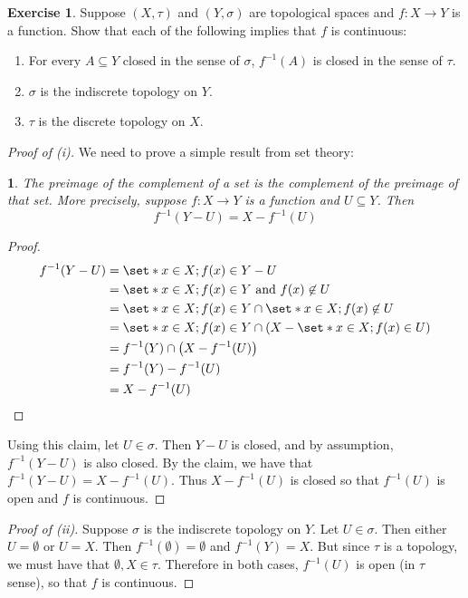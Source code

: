 \documentclass[11pt]{article}
\numberwithin{equation}{section}
\theoremstyle{plain}
\newtheorem{claim}{\color{ForestGreen}{\textbf{Claim}}}[section]
\theoremstyle{definition}
\newtheorem{exercise}{\color{YellowOrange}Exercise}[section]
\newcommand\parens[1]{\left( #1 \right)}
\newcommand\inv[1]{#1^{-1}}
\def\Set{\set*}%
\def\sse{\subseteq}
\newcommand{\1}{\mathbbm 1}
\def\t{\tau}
\begin{document}
\begin{exercise}
	Suppose $(X,\t)$ and $(Y,\sigma)$ are topological spaces and $f: X \to Y$ is a function. Show that each of the following implies that $f$ is continuous:
	\begin{enumerate}
		\item For every $A \sse Y$ closed in the sense of $\sigma$, $\inv{f}(A)$ is closed in the sense of $\t$.
		\item $\sigma$ is the indiscrete topology on $Y$.
		\item $\t$ is the discrete topology on $X$. 
	\end{enumerate}
\end{exercise}

\begin{proof}[Proof of (i)]
	We need to prove a simple result from set theory:
	\begin{claim}
		The preimage of the complement of a set is the complement of the preimage of that set. More precisely, suppose $f: X\to Y$ is a function and $U \sse Y$. Then 
		\begin{equation}
			\inv{f}(Y-U) = X - \inv{f}(U)
		\end{equation}
	\end{claim}
	\begin{proof}
		\begin{align*}
			\inv{f}(Y-U) &= \Set{x \in X; f(x) \in Y-U} \\
			&= \Set{x \in X; f(x) \in Y \text{ and } f(x) \not\in U} \\
			&= \Set{x \in X; f(x) \in Y} \cap \Set{x \in X; f(x) \not\in U} \\
			&= \Set{x \in X; f(x) \in Y} \cap \parens{X - \Set{x \in X; f(x) \in U}} \\
			&= \inv{f}(Y) \cap \parens{X - \inv{f}(U)} \\
			&= \inv{f}(Y) - \inv{f}(U) \\
			&= X - \inv{f}(U) 
		\end{align*}
	\end{proof}
	Using this claim, let $U \in \sigma$. Then $Y - U$ is closed, and by assumption, $\inv{f}(Y-U)$ is also closed. By the claim, we have that $\inv{f}(Y-U) = X - \inv{f}(U)$. Thus $X - \inv{f}(U)$ is closed so that $\inv{f}(U)$ is open and $f$ is continuous. 
\end{proof}

\begin{proof}[Proof of (ii)]
	Suppose $\sigma$ is the indiscrete topology on $Y$. Let $U \in \sigma$. Then either $U = \emptyset$ or $U = X$. Then $\inv{f}(\emptyset) = \emptyset$ and $\inv{f}(Y) = X$. But since $\t$ is a topology, we must have that $\emptyset, X \in \t$. Therefore in both cases, $\inv{f}(U)$ is open (in $\t$ sense), so that $f$ is continuous. 
\end{proof}
\end{document}
